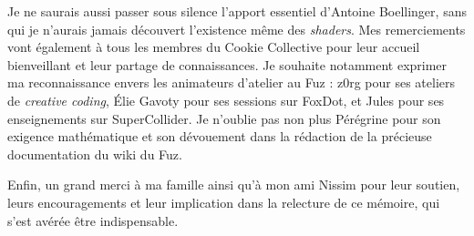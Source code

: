 \begin{titlepage}
\begin{minipage}[t][\textheight]{\textwidth}
\begin{flushleft}
            
            Je ne saurais aussi passer sous silence l'apport essentiel d'Antoine Boellinger, sans qui je n'aurais jamais découvert l'existence même des \textit{shaders}. Mes remerciements vont également à tous les membres du Cookie Collective pour leur accueil bienveillant et leur partage de connaissances. Je souhaite notamment exprimer ma reconnaissance envers les animateurs d'atelier au Fuz : z0rg pour ses ateliers de \textit{creative coding}, Élie Gavoty pour ses sessions sur FoxDot, et Jules pour ses enseignements sur SuperCollider. Je n'oublie pas non plus Pérégrine pour son exigence mathématique et son dévouement dans la rédaction de la précieuse documentation du wiki du Fuz.
            
            Enfin, un grand merci à ma famille ainsi qu'à mon ami Nissim pour leur soutien, leurs encouragements et leur implication dans la relecture de ce mémoire, qui s'est avérée être indispensable.
        \end{flushleft}
        \vspace*{\fill}
    \end{minipage}
\end{titlepage}

